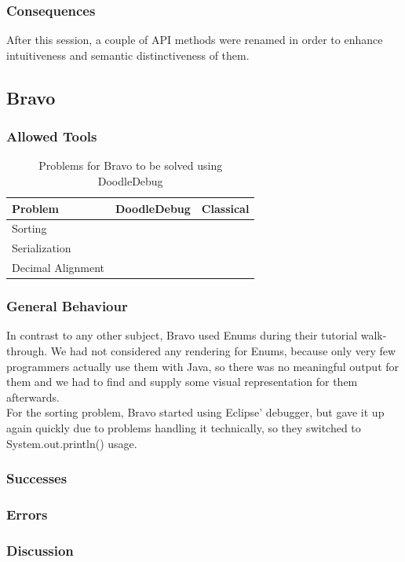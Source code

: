\documentclass[a4paper,ngerman,english]{amsbook} %
\newcommand{\tick}{\ding{51}}
\begin{document}
\subsubsection*{Consequences}
After this session, a couple of API methods were renamed in order to enhance intuitiveness and semantic distinctiveness of them.
\\

\subsection*{Bravo}
\subsubsection*{Allowed Tools}
\begin{table}[h]
\centering
\begin{tabular}{l c c}
{\bf Problem} & {\bf DoodleDebug} & {\bf Classical} \\ \hline
Sorting &  & \tick \\
Serialization & \tick &  \\
Decimal Alignment &  & \tick \\
\end{tabular}
\caption{Problems for Bravo to be solved using DoodleDebug}
\end{table}
\subsubsection*{General Behaviour}
In contrast to any other subject, Bravo used Enums during their tutorial walk-through. We had not considered any rendering for Enums, because only very few programmers actually use them with Java, so there was no meaningful output for them and we had to find and supply some visual representation for them afterwards.\\
For the sorting problem, Bravo started using Eclipse' debugger, but gave it up again quickly due to problems handling it technically, so they switched to System.out.println() usage.
\subsubsection*{Successes}
\subsubsection*{Errors}
\subsubsection*{Discussion}
\end{document}

